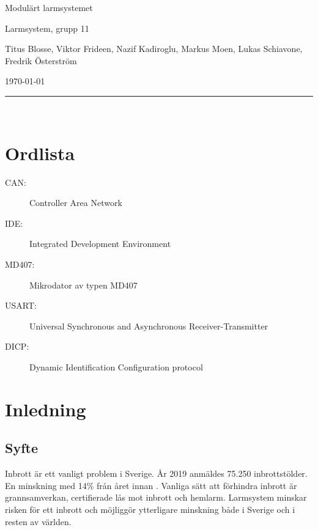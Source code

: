 \documentclass[a4paper]{article}
\newcommand\namn{Larmsystem}
\begin{document}
\thispagestyle{empty}

\begin{center}
    \parskip=14pt
    \vspace*{3\parskip}

    {\LARGE Modulärt larmsystemet}

    {\large \namn, grupp 11

    Titus Blosse, Viktor Frideen, Nazif Kadiroglu, Markus Moen, Lukas Schiavone, Fredrik Österström

    \today}

    \rule{7cm}{0.4pt}\\
\end{center}
\newpage

\thispagestyle{empty}

\tableofcontents
\newpage

\thispagestyle{empty}

\section*{Ordlista}

\begin{description}
    \item[CAN:] Controller Area Network
    \item[IDE:] Integrated Development Environment
    \item[MD407:] Mikrodator av typen MD407
    \item[USART:] Universal Synchronous and Asynchronous Receiver-Transmitter 
    \item[DICP:] Dynamic Identification Configuration protocol 
\end{description}
\newpage


\section{Inledning}
\subsection{Syfte}
Inbrott är ett vanligt problem i Sverige.
År 2019 anmäldes 75.250 inbrottstölder.
En minskning med 14\% från året innan \cite{brastold}.
Vanliga sätt att förhindra inbrott är grannsamverkan, certifierade lås mot inbrott och hemlarm.
Larmsystem minskar risken för ett inbrott och möjliggör ytterligare minskning både i Sverige och i resten av världen.
\end{document}
